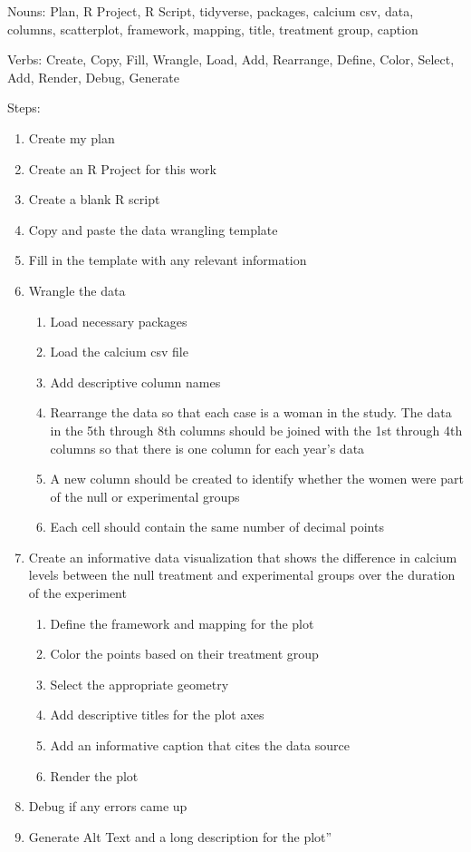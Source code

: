\documentclass[
  letterpaper,
  DIV=11,
  numbers=noendperiod]{scrartcl}
\begin{document}
Nouns: Plan, R Project, R Script, tidyverse, packages, calcium csv,
data, columns, scatterplot, framework, mapping, title, treatment group,
caption

Verbs: Create, Copy, Fill, Wrangle, Load, Add, Rearrange, Define, Color,
Select, Add, Render, Debug, Generate

Steps:

\begin{enumerate}
\def\labelenumi{\arabic{enumi}.}
\item
  Create my plan
\item
  Create an R Project for this work
\item
  Create a blank R script
\item
  Copy and paste the data wrangling template
\item
  Fill in the template with any relevant information
\item
  Wrangle the data

  \begin{enumerate}
  \def\labelenumii{\arabic{enumii}.}
  \item
    Load necessary packages
  \item
    Load the calcium csv file
  \item
    Add descriptive column names
  \item
    Rearrange the data so that each case is a woman in the study. The
    data in the 5th through 8th columns should be joined with the 1st
    through 4th columns so that there is one column for each year's data
  \item
    A new column should be created to identify whether the women were
    part of the null or experimental groups
  \item
    Each cell should contain the same number of decimal points
  \end{enumerate}
\item
  Create an informative data visualization that shows the difference in
  calcium levels between the null treatment and experimental groups over
  the duration of the experiment

  \begin{enumerate}
  \def\labelenumii{\arabic{enumii}.}
  \item
    Define the framework and mapping for the plot
  \item
    Color the points based on their treatment group
  \item
    Select the appropriate geometry
  \item
    Add descriptive titles for the plot axes
  \item
    Add an informative caption that cites the data source
  \item
    Render the plot
  \end{enumerate}
\item
  Debug if any errors came up
\item
  Generate Alt Text and a long description for the plot''
\end{enumerate}
\end{document}
